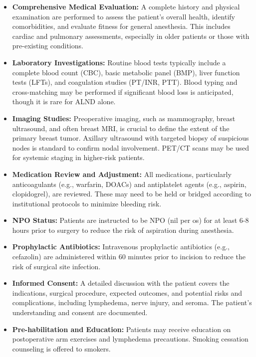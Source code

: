 \begin{itemize}
  \item \textbf{Comprehensive Medical Evaluation:} A complete history and physical examination are performed to assess the patient's overall health, identify comorbidities, and evaluate fitness for general anesthesia. This includes cardiac and pulmonary assessments, especially in older patients or those with pre-existing conditions.
  \item \textbf{Laboratory Investigations:} Routine blood tests typically include a complete blood count (CBC), basic metabolic panel (BMP), liver function tests (LFTs), and coagulation studies (PT/INR, PTT). Blood typing and cross-matching may be performed if significant blood loss is anticipated, though it is rare for ALND alone.
  \item \textbf{Imaging Studies:} Preoperative imaging, such as mammography, breast ultrasound, and often breast MRI, is crucial to define the extent of the primary breast tumor. Axillary ultrasound with targeted biopsy of suspicious nodes is standard to confirm nodal involvement. PET/CT scans may be used for systemic staging in higher-risk patients.
  \item \textbf{Medication Review and Adjustment:} All medications, particularly anticoagulants (e.g., warfarin, DOACs) and antiplatelet agents (e.g., aspirin, clopidogrel), are reviewed. These may need to be held or bridged according to institutional protocols to minimize bleeding risk.
  \item \textbf{NPO Status:} Patients are instructed to be NPO (nil per os) for at least 6-8 hours prior to surgery to reduce the risk of aspiration during anesthesia.
  \item \textbf{Prophylactic Antibiotics:} Intravenous prophylactic antibiotics (e.g., cefazolin) are administered within 60 minutes prior to incision to reduce the risk of surgical site infection.
  \item \textbf{Informed Consent:} A detailed discussion with the patient covers the indications, surgical procedure, expected outcomes, and potential risks and complications, including lymphedema, nerve injury, and seroma. The patient's understanding and consent are documented.
  \item \textbf{Pre-habilitation and Education:} Patients may receive education on postoperative arm exercises and lymphedema precautions. Smoking cessation counseling is offered to smokers.
\end{itemize}

